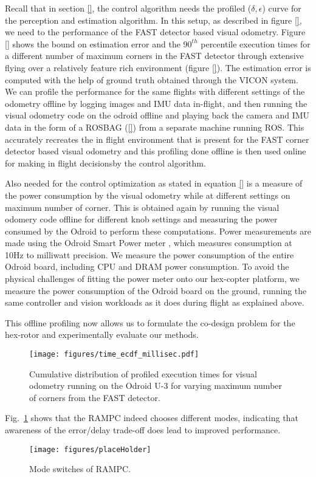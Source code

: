 Recall that in section \ref{}, the control algorithm needs the profiled ($\delta,\epsilon$) curve for the perception and estimation algorithm. In this setup, as described in figure \ref{}, we need to the performance of the FAST detector based visual odometry. Figure \ref{} shows the bound on estimation error and the $90^{th}$ percentile execution times for a different number of maximum corners in the FAST detector through extensive flying over a relatively feature rich environment (figure \ref{}). The estimation error is computed with the help of ground truth obtained through the VICON system. We can profile the performance for the same flights with different settings of the odometry offline by logging images and IMU data in-flight, and then running the visual odometry code on the odroid offline and playing back the camera and IMU data in the form of a ROSBAG (\ref{}) from a separate machine running ROS. 
This accurately recreates the in flight environment that is present for the FAST corner detector based visual odometry and this profiling done offline is then used online for making in flight decisionsby the control algorithm.

Also needed for the control optimization as stated in equation \ref{} is a measure of the power consumption by the visual odometry while at different settings on maximum number of corner. This is obtained again by running the visual odomery code offline for different knob settings and measuring the power consumed by the Odroid to perform these computations. Power measurements are made using the Odroid Smart Power meter \cite{OdroidSmartPower}, which measures consumption at 10Hz to milliwatt precision. We measure the power consumption of the entire Odroid board, including CPU and DRAM power consumption. To avoid the physical challenges of fitting the power meter onto our hex-copter platform, we measure the power consumption of the Odroid board on the ground, running the same controller and vision workloads as it does during flight as explained above.

This offline profiling now allows us to formulate the co-design problem for the hex-rotor and experimentally evaluate our methods.




\begin{figure}[htbp]
  \centering
  \texttt{[image: figures/time\_ecdf\_millisec.pdf]}
  \caption{Cumulative distribution of profiled execution times for visual odometry running on the Odroid U-3 for varying maximum number of corners from the FAST detector.}
\end{figure}

Fig.~\ref{fig:modeSwitching} shows that the RAMPC indeed chooses different modes, indicating that awareness of the error/delay trade-off does lead to improved performance.
\begin{figure}[t]
	\centering
	\texttt{[image: figures/placeHolder]}
	\caption{Mode switches of RAMPC.}
	\label{fig:modeSwitching}
\end{figure}



